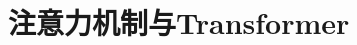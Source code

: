 \setcounter{chapter}{14}

\hypertarget{ux6ce8ux610fux529bux673aux5236ux4e0etransformer}{%
\chapter{注意力机制与Transformer}\label{ux6ce8ux610fux529bux673aux5236ux4e0etransformer}}
